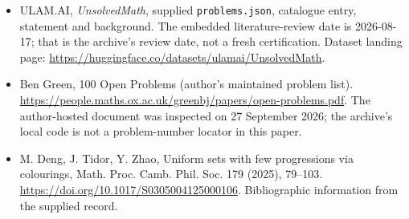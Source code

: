 \documentclass[11pt,a4paper]{article}
\begin{document}
{\small

\begin{itemize}

\item[\hypertarget{source:statement:1}{S1}] ULAM.AI, \emph{UnsolvedMath}, supplied \texttt{problems.json}, catalogue entry, statement and background. The embedded literature-review date is 2026-08-17; that is the archive’s review date, not a fresh certification. Dataset landing page: \url{https://huggingface.co/datasets/ulamai/UnsolvedMath}.

\item[\hypertarget{source:statement:2}{S2}] Ben Green, 100 Open Problems (author’s maintained problem list). \url{https://people.maths.ox.ac.uk/greenbj/papers/open-problems.pdf}. The author-hosted document was inspected on 27 September 2026; the archive’s local code is not a problem-number locator in this paper.

\item[\hypertarget{source:statement:3}{S3}] M. Deng, J. Tidor, Y. Zhao, Uniform sets with few progressions via colourings, Math. Proc. Camb. Phil. Soc. 179 (2025), 79--103. \url{https://doi.org/10.1017/S0305004125000106}. Bibliographic information from the supplied record.

\end{itemize}

}

\label{end:statement}
\end{document}
